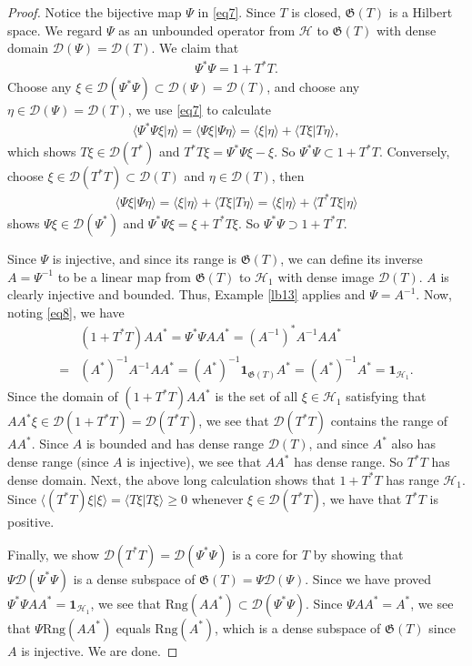 \documentclass[12pt,b5paper,notitlepage]{article}
\theoremstyle{definition}
\theoremstyle{plain}
\newcommand{\fk}{\mathfrak}
\newcommand{\mc}{\mathcal}
\newcommand{\idt}{\mathbf{1}}
\newcommand{\Dom}{\scr D}
\newcommand{\bk}[1]{\langle {#1}\rangle}
\newcommand{\scr}{\mathscr}
\newcommand{\Rng}{\mathrm{Rng}}
\numberwithin{equation}{section}
\begin{document}
\begin{proof}
Notice the bijective map $\Psi$ in \eqref{eq7}. Since $T$ is closed, $\fk G(T)$ is a Hilbert space. We regard $\Psi$ as an unbounded operator from $\mc H$ to  $\fk G(T)$ with dense domain $\Dom(\Psi)=\Dom(T)$.  We claim that
\begin{align}
\Psi^*\Psi=1+T^*T.	
\end{align}
Choose any $\xi\in\Dom(\Psi^*\Psi)\subset\Dom(\Psi)=\Dom(T)$, and choose any $\eta\in\Dom(\Psi)=\Dom(T)$, we use \eqref{eq7} to calculate
\begin{align*}
\bk{\Psi^*\Psi\xi|\eta}=\bk{\Psi\xi|\Psi\eta}=\bk{\xi|\eta}+\bk{T\xi|T\eta},
\end{align*}
which shows $T\xi\in\Dom(T^*)$ and $T^*T\xi=\Psi^*\Psi\xi-\xi$. So $\Psi^*\Psi\subset 1+T^*T$. Conversely, choose $\xi\in\Dom(T^*T)\subset\Dom(T)$ and $\eta\in\Dom(T)$, then 
\begin{align*}
\bk{\Psi\xi|\Psi\eta}=\bk{\xi|\eta}+\bk{T\xi|T\eta}=\bk{\xi|\eta}+\bk{T^*T\xi|\eta}	
\end{align*}
shows $\Psi\xi\in\Dom(\Psi^*)$ and $\Psi^*\Psi\xi=\xi+T^*T\xi$. So $\Psi^*\Psi\supset 1+T^*T$.

Since $\Psi$ is injective, and since its range is $\fk G(T)$, we can define its inverse $A=\Psi^{-1}$ to be a linear map from $\fk G(T)$ to $\mc H_1$ with dense image $\Dom(T)$. $A$ is clearly injective and bounded. Thus, Example \ref{lb13} applies and $\Psi=A^{-1}$.  Now, noting \eqref{eq8}, we have
\begin{align*}
&(1+T^*T)AA^*=\Psi^*\Psi AA^*=(A^{-1})^*A^{-1}AA^*\\
=&(A^*)^{-1}A^{-1}AA^*=	(A^*)^{-1}\idt_{\fk G(T)} A^*=(A^*)^{-1}A^*=\idt_{\mc H_1}.
\end{align*}
Since the domain of $(1+T^*T)AA^*$ is the set of all $\xi\in\mc H_1$ satisfying that $AA^*\xi\in\Dom(1+T^*T)=\Dom(T^*T)$, we see that $\Dom(T^*T)$ contains the range of $AA^*$. Since $A$ is bounded and has dense range $\Dom(T)$, and since $A^*$ also has dense range (since $A$ is injective), we see that $AA^*$ has dense range. So $T^*T$ has dense domain. Next, the above long calculation shows that $1+T^*T$ has range $\mc H_1$. Since $\bk{(T^*T)\xi|\xi}=\bk{T\xi|T\xi}\geq 0$ whenever $\xi\in\Dom(T^*T)$, we have that $T^*T$ is positive.

Finally, we show $\Dom(T^*T)=\Dom(\Psi^*\Psi)$ is a core for $T$ by showing that $\Psi\Dom(\Psi^*\Psi)$ is a dense subspace of $\fk G(T)=\Psi\Dom(\Psi)$. Since we have proved $\Psi^*\Psi AA^*=\idt_{\mc H_1}$, we see that $\Rng(AA^*)\subset\Dom(\Psi^*\Psi)$. Since $\Psi AA^*=A^*$, we see that $\Psi\Rng(AA^*)$ equals $\Rng(A^*)$, which is a dense subspace of $\fk G(T)$ since $A$ is injective. We are done.
\end{proof}
\end{document}
